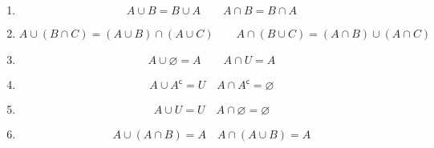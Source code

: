 \documentclass[a4paper, 12pt, oneside, titlepage, BCOR=1mm, DIV=12]{scrreprt}
\newcommand{\compl}{^\mathsf{c}}
\let\emptyset\varnothing
\let\emptyset\varnothing
\newcommand{\compl}{^\mathsf{c}}
\begin{document}
  \begin{center}\large{}\end{center}

  \begin{enumerate}
    \item \normalsize{}

      \begin{displaymath}
        A\cup{B} = B\cup{A} \qquad A\cap{B} = B\cap{A}
      \end{displaymath}

    \item \normalsize{}

      \begin{displaymath}
        A\cup{(B\cap{C})} = (A\cup{B})\cap{(A\cup{C})} \qquad A\cap{(B\cup{C})} = (A\cap{B})\cup{(A\cap{C})}
      \end{displaymath}

    \item \normalsize{}

      \begin{displaymath}
        A\cup{\emptyset} = A \qquad A\cap{U}=A
      \end{displaymath}

    \item \normalsize{}

      \begin{displaymath}
        A \cup{A\compl} = U \quad A\cap{A}\compl=\emptyset
      \end{displaymath}

    \item \normalsize{}

      \begin{displaymath}
        A \cup{U} = U \quad A\cap\emptyset=\emptyset
      \end{displaymath}

    \item \normalsize{}

      \begin{displaymath}
        A\cup{(A\cap{B})} = A \quad A\cap{(A\cup{B})} = A
      \end{displaymath}


\end{enumerate}
\end{document}
